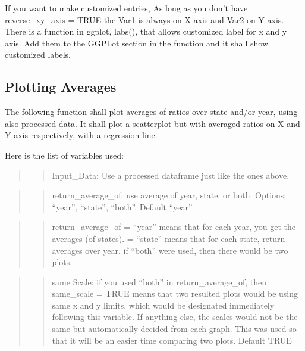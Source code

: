 \documentclass[
]{article}
\begin{document}
If you want to make customized entries, As long as you don't have
reverse\_xy\_axis = TRUE the Var1 is always on X-axis and Var2 on
Y-axis. There is a function in ggplot, labs(), that allows customized
label for x and y axis. Add them to the GGPLot section in the function
and it shall show customized labels.

\hypertarget{plotting-averages}{%
\subsection{Plotting Averages}\label{plotting-averages}}

The following function shall plot averages of ratios over state and/or
year, using also processed data. It shall plot a scatterplot but with
averaged ratios on X and Y axis respectively, with a regression line.

Here is the list of variables used:

\begin{quote}
\begin{quote}
Input\_Data: Use a processed dataframe just like the ones above.
\end{quote}
\end{quote}

\begin{quote}
\begin{quote}
return\_average\_of: use average of year, state, or both. Options:
``year'', ``state'', ``both''. Default ``year''
\end{quote}
\end{quote}

\begin{quote}
\begin{quote}
return\_average\_of = ``year'' means that for each year, you get the
averages (of states). = ``state'' means that for each state, return
averages over year. if ``both'' were used, then there would be two
plots.
\end{quote}
\end{quote}

\begin{quote}
\begin{quote}
same Scale: if you used ``both'' in return\_average\_of, then
same\_scale = TRUE means that two resulted plots would be using same x
and y limits, which would be designated immediately following this
variable. If anything else, the scales would not be the same but
automatically decided from each graph. This was used so that it will be
an easier time comparing two plots. Default TRUE
\end{quote}
\end{quote}
\end{document}
